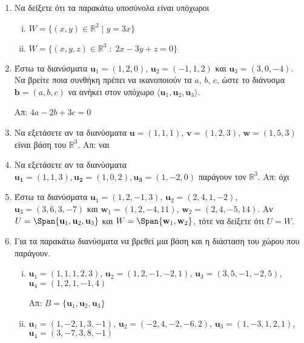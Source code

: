 \begin{enumerate}
  \item Να δείξετε ότι τα παρακάτω υποσύνολα είναι υπόχωροι
    \begin{enumerate}[(i)]
      \item $ W = \{ (x,y) \in \mathbb{R}^{2} \mid y = 3x \} $ 
      \item $ W = \{(x,y,z)\in \mathbb{R}^{3} \; : \; 2x-3y+z=0 \} $
    \end{enumerate}

  \item\label{ask:eksart3} Έστω τα διανύσματα $ \mathbf{u}_{1} = (1,2,0) $, 
    $ \mathbf{u}_{2} = (-1,1,2) $ 
    και $ \mathbf{u}_{3} = (3,0,-4) $. Να βρείτε ποια συνθήκη πρέπει να ικανοποιούν τα 
    $a$, $b$, $c$, ώστε το διάνυσμα $ \mathbf{b} = (a,b,c) $ να ανήκει στον υπόχωρο 
    $ \langle \mathbf{u}_{1}, \mathbf{u}_{2}, \mathbf{u}_{3} \rangle $.

    \hfill Απ: $ 4a -2b + 3c = 0 $ 

  \item\label{ask:baseeks} Να εξετάσετε αν τα διανύσματα $ \mathbf{u} = (1,1,1)$, 
    $ \mathbf{v} = (1,2,3)$, $ \mathbf{w} = (1,5,3) $ είναι βάση του $\mathbb{R}^{3}$. 
    \hfill Απ: ναι 

  \item\label{ask:parag} Να εξετάσετε αν τα διανύσματα $ \mathbf{u_{1}} = (1,1,3), 
    \mathbf{u_{2}} = (1,0,2), \mathbf{u_{3}}= (1,-2,0)$ παράγουν τον $ \mathbb{R}^{3} $.
    \hfill Απ: όχι 

  \item\label{ask:isoi} Έστω τα διανύσματα $ \mathbf{u}_{1} = (1,2,-1,3)$, 
    $\mathbf{u}_{2} = (2,4,1,-2)$, $ \mathbf{u} _{3} = (3,6,3,-7) $ και 
    $ \mathbf{w}_{1} = (1,2,-4,11)$, $ \mathbf{w}_{2} = (2,4,-5,14) $. 
    Αν $ U = \Span \{ \mathbf{u}_{1}, \mathbf{u}_{2}, \mathbf{u}_{3} \} $ και 
    $ W = \Span \{ \mathbf{w}_{1}, \mathbf{w}_{2} \} $, τότε να δείξετε ότι $ U=W $.

  \item\label{ask:parag2} Για τα παρακάτω διανύσματα να βρεθεί μια βάση και η διάσταση 
    του χώρου που παράγουν.
    \begin{enumerate}[(i)]
      \item $ \mathbf{u}_{1} = (1,1,1,2,3) $, $ \mathbf{u}_{2} = (1,2,-1,-2,1) $, 
        $ \mathbf{u} _{3} = (3,5,-1,-2,5) $, $ \mathbf{u}_{4} = (1,2,1,-1,4) $

        \hfill Απ: $ B = \{ \mathbf{u}_{1}, \mathbf{u}_{2}, \mathbf{u}_{3}\} $ 

      \item $ \mathbf{u}_{1} = (1,-2,1,3,-1) $, $ \mathbf{u}_{2} = (-2,4,-2,-6,2) $, $
        \mathbf{u}_{3} = (1,-3,1,2,1) $, $ \mathbf{u}_{4} = (3,-7,3,8,-1) $


\end{enumerate}
\end{enumerate}
